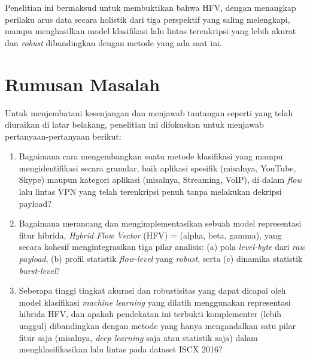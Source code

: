 Penelitian ini bermaksud untuk membuktikan bahwa HFV, dengan menangkap perilaku arus data secara holistik dari tiga perspektif yang saling melengkapi, mampu menghasilkan model klasifikasi lalu lintas terenkripsi yang lebih akurat dan \textit{robust} dibandingkan dengan metode yang ada saat ini.

\section{Rumusan Masalah}
\label{sec:rumusan_masalah}
Untuk menjembatani kesenjangan dan menjawab tantangan seperti yang telah diuraikan di latar belakang, penelitian ini difokuskan untuk menjawab pertanyaan-pertanyaan berikut:
\begin{enumerate}
    \item Bagaimana cara mengembangkan suatu metode klasifikasi yang mampu mengidentifikasi secara granular, baik aplikasi spesifik (misalnya, YouTube, Skype) maupun kategori aplikasi (misalnya, Streaming, VoIP), di dalam \textit{flow} lalu lintas VPN yang telah terenkripsi penuh tanpa melakukan dekripsi payload?
    
    \item Bagaimana merancang dan mengimplementasikan sebuah model representasi fitur hibrida, \textit{Hybrid Flow Vector} (HFV) = (alpha, beta, gamma), yang secara kohesif mengintegrasikan tiga pilar analisis: (a) pola \textit{level-byte} dari \textit{raw payload}, (b) profil statistik \textit{flow-level} yang \textit{robust}, serta (c) dinamika statistik \textit{burst-level}?
    
    \item Seberapa tinggi tingkat akurasi dan robustisitas yang dapat dicapai oleh model klasifikasi \textit{machine learning} yang dilatih menggunakan representasi hibrida HFV, dan apakah pendekatan ini terbukti komplementer (lebih unggul) dibandingkan dengan metode yang hanya mengandalkan satu pilar fitur saja (misalnya, \textit{deep learning} saja atau statistik saja) dalam mengklasifikasikan lalu lintas pada dataset ISCX 2016?
\end{enumerate}

